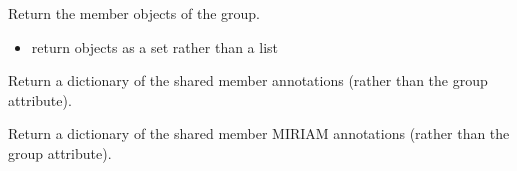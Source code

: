 \documentclass[letterpaper,10pt,english]{sphinxmanual}
\begin{document}
\begin{fulllineitems}
\begin{fulllineitems}
\begin{itemize}
\end{itemize}

\end{fulllineitems}


\begin{fulllineitems}
\label{\detokenize{modules_doc:cbmpy.CBModel.Group.getMembers}}
\pysigstartsignatures
{}
\pysigstopsignatures
\sphinxAtStartPar
Return the member objects of the group.
\begin{itemize}
\item {} 
\sphinxAtStartPar
{} return objects as a set rather than a list

\end{itemize}

\end{fulllineitems}


\begin{fulllineitems}
\label{\detokenize{modules_doc:cbmpy.CBModel.Group.getSharedAnnotations}}
\pysigstartsignatures
{}
\pysigstopsignatures
\sphinxAtStartPar
Return a dictionary of the shared member annotations (rather than the group attribute).

\end{fulllineitems}


\begin{fulllineitems}
\label{\detokenize{modules_doc:cbmpy.CBModel.Group.getSharedMIRIAMannotations}}
\pysigstartsignatures
{}
\pysigstopsignatures
\sphinxAtStartPar
Return a dictionary of the shared member MIRIAM annotations (rather than the group attribute).

\end{fulllineitems}



\end{fulllineitems}
\end{document}
